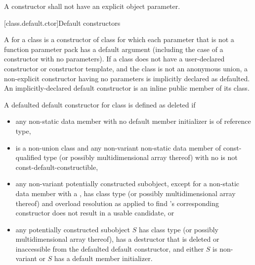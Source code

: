 \pnum
A constructor shall not have an explicit object parameter.

[class.default.ctor]{Default constructors}

\pnum
{}%
%
A  for a class 
is a constructor of class 
for which each parameter
that is not a function parameter pack
has a default argument
(including the case of a constructor with no parameters).
%
If a class does not have
a user-declared constructor or constructor template,
and the class is not an anonymous union,
a non-explicit constructor having no parameters is implicitly declared
as defaulted.
An implicitly-declared default constructor is an
inline public member of its class.

\pnum
A defaulted default constructor for class  is defined as deleted if
\begin{itemize}
\item any non-static data member with no default member initializer is
of reference type,

\item {} is a non-union class and
any non-variant non-static data member of const-qualified type
(or possibly multidimensional array thereof)
with no 
is not const-default-constructible,

\item any non-variant potentially constructed subobject, except for a non-static data member
with a ,
has class type  (or possibly multidimensional array thereof)
and overload resolution
as applied to find 's corresponding constructor
does not result in a usable candidate, or

\item any potentially constructed subobject $S$ has
class type  (or possibly multidimensional array thereof),
 has
a destructor that is deleted or inaccessible from the defaulted default
constructor, and
either $S$ is non-variant or $S$ has a default member initializer.
\end{itemize}

